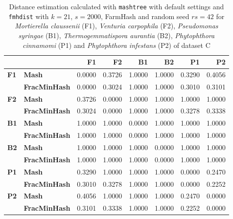 \begin{table}[]
  \centering
  \begin{tabular}{@{}llrrrrrr@{}}
  \toprule
              &                      & \textbf{F1} & \textbf{F2} & \textbf{B1} & \textbf{B2} & \textbf{P1} & \textbf{P2} \\ \midrule
  \textbf{F1} & \textbf{Mash}        & 0.0000      & 0.3726      & 1.0000      & 1.0000      & 0.3290      & 0.4056      \\
  \textbf{}   & \textbf{FracMinHash} & 0.0000      & 0.3024      & 1.0000      & 1.0000      & 0.3010      & 0.3101      \\ \midrule
  \textbf{F2} & \textbf{Mash}        & 0.3726      & 0.0000      & 1.0000      & 1.0000      & 1.0000      & 1.0000      \\
  \textbf{}   & \textbf{FracMinHash} & 0.3024      & 0.0000      & 1.0000      & 1.0000      & 0.3278      & 0.3338      \\ \midrule
  \textbf{B1} & \textbf{Mash}        & 1.0000      & 1.0000      & 0.0000      & 1.0000      & 1.0000      & 1.0000      \\
  \textbf{}   & \textbf{FracMinHash} & 1.0000      & 1.0000      & 0.0000      & 1.0000      & 1.0000      & 1.0000      \\ \midrule
  \textbf{B2} & \textbf{Mash}        & 1.0000      & 1.0000      & 1.0000      & 0.0000      & 1.0000      & 1.0000      \\
  \textbf{}   & \textbf{FracMinHash} & 1.0000      & 1.0000      & 1.0000      & 0.0000      & 1.0000      & 1.0000      \\ \midrule
  \textbf{P1} & \textbf{Mash}        & 0.3290      & 1.0000      & 1.0000      & 1.0000      & 0.0000      & 0.2470      \\
  \textbf{}   & \textbf{FracMinHash} & 0.3010      & 0.3278      & 1.0000      & 1.0000      & 0.0000      & 0.2252      \\ \midrule
  \textbf{P2} & \textbf{Mash}        & 0.4056      & 1.0000      & 1.0000      & 1.0000      & 0.2470      & 0.0000      \\
  \textbf{}   & \textbf{FracMinHash} & 0.3101      & 0.3338      & 1.0000      & 1.0000      & 0.2252      & 0.0000      \\ \bottomrule
  \end{tabular}
  \caption{Distance estimation calculated with \texttt{mashtree} with default
  settings and \texttt{fmhdist} with $k=21$, $s=2000$, FarmHash and random seed
  $rs=42$ for \textit{Mortierella claussenii} (F1), \textit{Venturia carpophila}
  (F2), \textit{Pseudomonas syringae} (B1), \textit{Thermogemmatispora aurantia}
  (B2), \textit{Phytophthora cinnamomi} (P1) and \textit{Phytophthora infestans}
  (P2) of dataset C}
  \label{ta:avocadoDistance}
\end{table}

